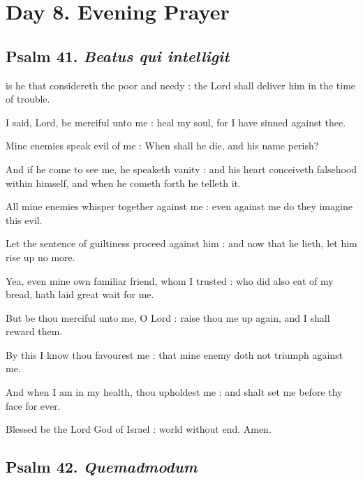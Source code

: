 \section*{Day 8. Evening Prayer}

\subsection{Psalm 41. \textit{Beatus qui intelligit}}

 is he that considereth the poor and needy : the Lord shall deliver him in the time of trouble.\par
{}
I said, Lord, be merciful unto me : heal my soul, for I have sinned against thee.\par
{}Mine enemies speak evil of me : When shall he die, and his name perish?\par
{}And if he come to see me, he speaketh vanity : and his heart conceiveth falsehood within himself, and when he cometh forth he telleth it.\par
{}All mine enemies whisper together against me : even against me do they imagine this evil.\par
{}Let the sentence of guiltiness proceed against him : and now that he lieth, let him rise up no more.\par
{}Yea, even mine own familiar friend, whom I trusted : who did also eat of my bread, hath laid great wait for me.\par
{}But be thou merciful unto me, O Lord : raise thou me up again, and I shall reward them.\par
{}By this I know thou favourest me : that mine enemy doth not triumph against me.\par
{}And when I am in my health, thou upholdest me : and shalt set me before thy face for ever.\par
{}Blessed be the Lord God of Israel : world without end. Amen.\par

\subsection{Psalm 42. \textit{Quemadmodum}}

